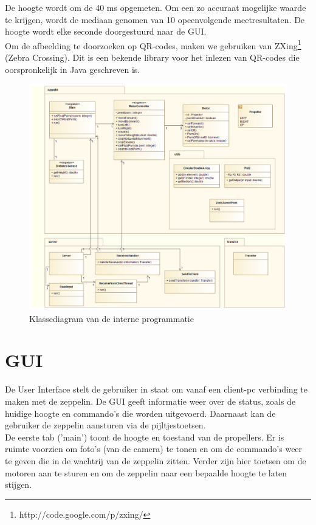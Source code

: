 \documentclass[eind]{penoverslag}
\begin{document}
De hoogte wordt om de 40 ms opgemeten. Om een zo accuraat mogelijke waarde te krijgen, wordt de mediaan genomen van 10 opeenvolgende meetresultaten. De hoogte wordt elke seconde doorgestuurd naar de GUI. \\

Om de afbeelding te doorzoeken op QR-codes, maken we gebruiken van ZXing\footnote{http://code.google.com/p/zxing/} (Zebra Crossing). Dit is een bekende library voor het inlezen van QR-codes die oorspronkelijk in Java geschreven is. \\

\begin{figure}[h!]
\centering
\includegraphics[scale=0.4, angle=90]{UML.png}
\caption{Klassediagram van de interne programmatie}
\label{UML}
\end{figure}

\section{GUI}
De User Interface stelt de gebruiker in staat om vanaf een client-pc verbinding te maken met de zeppelin. De GUI geeft informatie weer over de status, zoals de huidige hoogte en commando's die worden uitgevoerd. Daarnaast kan de gebruiker de zeppelin aansturen via de pijltjestoetsen. \\

De eerste tab ('main') toont de hoogte en toestand van de propellers. Er is ruimte voorzien om foto's (van de camera) te tonen en om de commando's weer te geven die in de wachtrij van de zeppelin zitten. Verder zijn hier toetsen om de motoren aan te sturen en om de zeppelin naar een bepaalde hoogte te laten stijgen.\\
\end{document}
